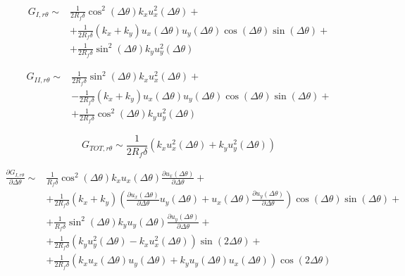 \documentclass[a4paper]{jpconf}
\begin{document}
\begin{equation}
\begin{split}
G_{I,r\theta} \sim&\frac{1}{2R_{f}\delta}\cos^{2}\left(\Delta\theta\right) k_{x}u^{2}_{x}\left(\Delta\theta\right)+\\
&+\frac{1}{2R_{f}\delta}\left(k_{x}+k_{y}\right)u_{x}\left(\Delta\theta\right)u_{y}\left(\Delta\theta\right)\cos\left(\Delta\theta\right)\sin\left(\Delta\theta\right)+\\
&+\frac{1}{2R_{f}\delta}\sin^{2}\left(\Delta\theta\right)k_{y}u^{2}_{y}\left(\Delta\theta\right)
\end{split}
\end{equation}

\begin{equation}
\begin{split}
G_{II,r\theta} \sim&\frac{1}{2R_{f}\delta}\sin^{2}\left(\Delta\theta\right) k_{x}u^{2}_{x}\left(\Delta\theta\right)+\\
&-\frac{1}{2R_{f}\delta}\left(k_{x}+k_{y}\right)u_{x}\left(\Delta\theta\right)u_{y}\left(\Delta\theta\right)\cos\left(\Delta\theta\right)\sin\left(\Delta\theta\right)+\\
&+\frac{1}{2R_{f}\delta}\cos^{2}\left(\Delta\theta\right)k_{y}u^{2}_{y}\left(\Delta\theta\right)
\end{split}
\end{equation}

\begin{equation}
G_{TOT,r\theta} \sim\frac{1}{2R_{f}\delta}\left( k_{x}u^{2}_{x}\left(\Delta\theta\right)+ k_{y}u^{2}_{y}\left(\Delta\theta\right)\right)
\end{equation}

\begin{equation}
\begin{split}
\frac{\partial G_{I,r\theta}}{\partial\Delta\theta} \sim&\frac{1}{R_{f}\delta}\cos^{2}\left(\Delta\theta\right) k_{x}u_{x}\left(\Delta\theta\right)\frac{\partial u_{x}\left(\Delta\theta\right)}{\partial\Delta\theta}+\\
&+\frac{1}{2R_{f}\delta}\left(k_{x}+k_{y}\right)\left(\frac{\partial u_{x}\left(\Delta\theta\right)}{\partial\Delta\theta}u_{y}\left(\Delta\theta\right)+u_{x}\left(\Delta\theta\right)\frac{\partial u_{y}\left(\Delta\theta\right)}{\partial\Delta\theta}\right)\cos\left(\Delta\theta\right)\sin\left(\Delta\theta\right)+\\
&+\frac{1}{R_{f}\delta}\sin^{2}\left(\Delta\theta\right)k_{y}u_{y}\left(\Delta\theta\right)\frac{\partial u_{y}\left(\Delta\theta\right)}{\partial\Delta\theta}+\\
&+\frac{1}{2R_{f}\delta}\left(k_{y}u^{2}_{y}\left(\Delta\theta\right)- k_{x}u^{2}_{x}\left(\Delta\theta\right)\right)\sin\left(2\Delta\theta\right)+\\
&+\frac{1}{2R_{f}\delta}\left(k_{x}u_{x}\left(\Delta\theta\right)u_{y}\left(\Delta\theta\right)+k_{y}u_{y}\left(\Delta\theta\right)u_{x}\left(\Delta\theta\right)\right)\cos\left(2\Delta\theta\right)\\
\end{split}
\end{equation}
\end{document}
